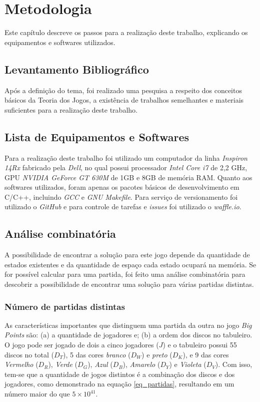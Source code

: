 \chapter[Metodologia]{Metodologia}
\label{cha:metodologia}
	Este capítulo descreve os passos para a realização deste trabalho, explicando os equipamentos e softwares utilizados.

\section{Levantamento Bibliográfico}
\label{sec:levantamento-bibliografico}
Após a definição do tema, foi realizado uma pesquisa a respeito dos conceitos básicos da Teoria dos Jogos, a existência de trabalhos semelhantes e materiais suficientes para a realização deste trabalho.

\section{Lista de Equipamentos e Softwares}
\label{sec:lista-de-equipamentos-e-softwares}

Para a realização deste trabalho foi utilizado um computador da linha \emph{Inspiron 14Rx} fabricado pela \emph{Dell}, no qual possui processador \emph{Intel Core i7} de 2,2 GHz, GPU \emph{NVIDIA GeForce GT 630M} de 1GB e 8GB de memória RAM. Quanto aos softwares utilizados, foram apenas os pacotes básicos de desenvolvimento em C/C++, incluindo \emph{GCC} e \emph{GNU Makefile}. Para serviço de versionamento foi utilizado o \emph{GitHub} e para controle de tarefas e \emph{issues} foi utilizado o \emph{waffle.io}.

\section{Análise combinatória}

A possibilidade de encontrar a solução para este jogo depende da quantidade de estados existentes e da quantidade de espaço cada estado ocupará na memória. Se for possível calcular para uma partida, foi feito uma análise combinatória para descobrir a possibilidade de encontrar uma solução para várias partidas distintas.

\subsection{Número de partidas distintas}
As características importantes que distinguem uma partida da outra no jogo \emph{Big Points} são: (a) a quantidade de jogadores e; (b) a ordem dos discos no tabuleiro. O jogo pode ser jogado de dois a cinco jogadores ($J$) e o tabuleiro possui 55 discos no total ($D_T$), 5 das cores \emph{branco} ($D_W$) e \emph{preto} ($D_K$), e 9 das cores \emph{Vermelho} ($D_R$), \emph{Verde} ($D_G$), \emph{Azul} ($D_B$), \emph{Amarelo} ($D_Y$) e \emph{Violeta} ($D_V$). Com isso, tem-se que a quantidade de jogos distintos é a combinação dos discos e dos jogadores, como demonstrado na equação \ref{eq_partidas}, resultando em um número maior do que $5\times 10^{41}$.

